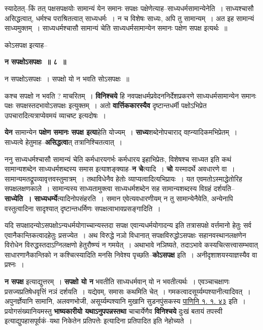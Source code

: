 \documentclass[article,12pt,a4paper]{memoir}
\begin{document}
	स्यादेतत्--किं तत् पक्षसपक्षयोः सामान्यं येन समानः सपक्षः पक्षेणेत्याह--साध्यधर्मसामान्येनेति । साध्यश्चासौ असिद्धत्वात्, धर्मश्च पराश्रितत्वात् साध्यधर्मः । न च विशेषः साध्यः, अपि तु सामान्यम् । अत इह सामान्यं साध्यमुक्तम् । साध्यधर्मश्चासौ सामान्यं चेति साध्यधर्मसामान्येन समानः पक्षेण सपक्ष इत्यर्थः ॥  
	  
	कोऽसपक्ष इत्याह--  
	  
	\textbf{न सपक्षोऽसपक्षः ॥ ८ ॥} 
	  
	न सपक्षोऽसपक्षः । सपक्षो यो न भवति सोऽसपक्षः ॥  
	  
	कश्च सपक्षो न भवति ? माचरितम् । \textbf{विनिश्चये} हि नवपक्षधर्मप्रवेदननिर्देशप्रकरणे साध्यधर्मसामान्येन समानः पक्षः सपक्षस्तदभावोऽसपक्षः इत्युक्तम् । अतो \textbf{वार्त्तिककारस्यैव} दृष्टान्तधर्मी पक्षोऽभिप्रेत उपचारादित्यत्राप्येवमयं व्याचष्ट इत्यदोषः ।
	\pend
      

	  \pstart \textbf{येन} सामान्येन \textbf{पक्षेण समानः सपक्ष इत्या}हेति योज्यम् । \textbf{साध्य}शब्देनोपचाराद् वह्न्यादिकमभिप्रेतम् । साध्यत्वे हेतुमाह--\textbf{असिद्धत्वा}त् तत्रानिश्चितत्वात् ।
	\pend
      

	  \pstart ननु साध्यधर्मश्चासौ सामान्यं चेति कर्मधारयगर्भः कर्मधारय इहाभिप्रेतः, विशेषश्च साध्यत इति कथं सामान्यशब्देन साध्यधर्मशब्दस्य समास इत्याशङ्क्याह--\textbf{न चे}त्यादि । \textbf{चो} यस्मादर्थे अवधारणे वा । सामान्यमतद्रूपव्यावृत्तवस्तुमात्रम् । तथाविधेनैव हेतोः \leavevmode{} व्याप्यत्वादित्यभिप्रायः । यत एवमतोऽस्माद्धेतोरिह सपक्षलक्षणकाले । सामान्यस्य साध्यतामुक्त्वा साध्यधर्मशब्देन सह सामान्यशब्दस्य विग्रहं दर्शयति--\textbf{साध्येति । साध्यधर्म्ये}त्यादिनोपसंहरति । समान एवेत्यवधारणीयम् न तु सामान्येनैवेति, अन्येनापि वस्तुत्वादिना सादृश्यात् दृष्टान्तधर्मिणः सपक्षत्वाभावप्रसङ्गादिति ।
	\pend
      

	  \pstart यदि सपक्षादन्योऽसपक्षोऽन्यधर्मयोगाच्चान्यस्तदा सपक्ष एवान्यधर्मयोगादन्य इति तत्रासपक्षे वर्त्तमानो हेतुः सर्व एवानैकान्तिकत्वादहेतुः प्रसज्येत । अथ विरुद्धे नञो विधानात् सपक्षविरुद्धोऽसपक्षः सहानवस्थानलक्षणेन विरोधेन विरुद्धस्तदाऽग्निलक्षणो हेतुरौष्ण्यं न गमयेत् । अथाभावे नञिष्यते, तदाऽभावे कस्यचित्सत्त्वासम्भवात् साधारणानैकान्तिको न कश्चित्स्यादिति मनसि निवेश्य पृच्छति--\textbf{कोऽसपक्ष} इति । अनीदृशाशयस्याज्ञस्यैव वा प्रश्नः ।
	\pend
      

	  \pstart \textbf{न सपक्ष} इत्याद्युत्तरम् । \textbf{सपक्षो यो न} भवतीति साध्यधर्मवान् यो न भवतीत्यर्थः । एवञ्चाचक्षाणः प्रसज्यप्रतिषेधवृत्तिं नञं दर्शयति । यद्येवम्, समासः कथमिति चेत् । गमकत्वादसूर्य्यम्पश्यानीत्यादिवत् । अपुनर्ज्ञेयानि सामानि, अलवणभोजी, असूर्य्यम्पश्यानि मुखानि सुडनपुंसकस्य \href{http://sarit.indology.info/?cref=Pā.1.1.43}{पाणिनि १. १. ४३} इति । प्रयोगसंख्यानियमस्तु \textbf{भाष्यकारीयो यथाऽनुपपन्नस्तथा} चाचार्येणैव \textbf{विनिश्चये} दुःखं बतायं तपस्वी इत्याद्युपहासपूर्वकं--यथा निकेतेन प्रतिपत्तेः इत्यादिना प्रतिपादित इति नेहोच्यते ।
	\pend
	  \bigskip
	  \begingroup
	
\end{document}
